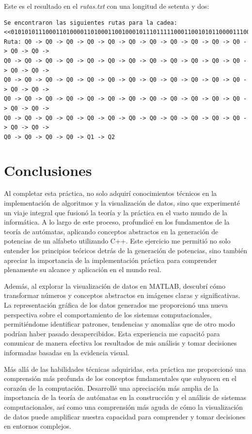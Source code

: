 \documentclass{article}
\begin{document}
Este es el resultado en el \textit{rutas.txt} con una longitud de setenta y dos:
\begin{lstlisting}[language={},basicstyle=\ttfamily\footnotesize, breaklines=true]
Se encontraron las siguientes rutas para la cadea:
<<01010101110001101000011010001100100010111011111000110010101100001110001101>>:
Ruta: Q0 -> Q0 -> Q0 -> Q0 -> Q0 -> Q0 -> Q0 -> Q0 -> Q0 -> Q0 -> Q0 -> Q0 -> Q0 ->
Q0 -> Q0 -> Q0 -> Q0 -> Q0 -> Q0 -> Q0 -> Q0 -> Q0 -> Q0 -> Q0 -> Q0 -> Q0 -> Q0 ->
Q0 -> Q0 -> Q0 -> Q0 -> Q0 -> Q0 -> Q0 -> Q0 -> Q0 -> Q0 -> Q0 -> Q0 -> Q0 -> Q0 ->
Q0 -> Q0 -> Q0 -> Q0 -> Q0 -> Q0 -> Q0 -> Q0 -> Q0 -> Q0 -> Q0 -> Q0 -> Q0 -> Q0 ->
Q0 -> Q0 -> Q0 -> Q0 -> Q0 -> Q0 -> Q0 -> Q0 -> Q0 -> Q0 -> Q0 -> Q0 -> Q0 -> Q0 ->
Q0 -> Q0 -> Q0 -> Q0 -> Q1 -> Q2

\end{lstlisting}


\section{Conclusiones}
Al completar esta práctica, no solo adquirí conocimientos técnicos en la implementación de algoritmos y la visualización de datos, sino
que experimenté un viaje integral que fusionó la teoría y la práctica en el vasto mundo de la informática. A lo largo de este proceso,
profundicé en los fundamentos de la teoría de autómatas, aplicando conceptos abstractos en la generación de potencias de un alfabeto
utilizando C++. Este ejercicio me permitió no solo entender los principios teóricos detrás de la generación de potencias, sino también
apreciar la importancia de la implementación práctica para comprender plenamente su alcance y aplicación en el mundo real.

Además, al explorar la visualización de datos en MATLAB, descubrí cómo transformar números y conceptos abstractos en imágenes claras y
significativas. La representación gráfica de los datos generados me proporcionó una nueva perspectiva sobre el comportamiento de los
sistemas computacionales, permitiéndome identificar patrones, tendencias y anomalías que de otro modo podrían haber pasado desapercibidos.
Esta experiencia me capacitó para comunicar de manera efectiva los resultados de mis análisis y tomar decisiones informadas basadas en
la evidencia visual.

Más allá de las habilidades técnicas adquiridas, esta práctica me proporcionó una comprensión más profunda de los conceptos
fundamentales que subyacen en el corazón de la computación. Desarrollé una apreciación más amplia de la importancia de la teoría de
autómatas en la construcción y el análisis de sistemas computacionales, así como una comprensión más aguda de cómo la visualización de
datos puede amplificar nuestra capacidad para comprender y tomar decisiones en entornos complejos.
\end{document}
